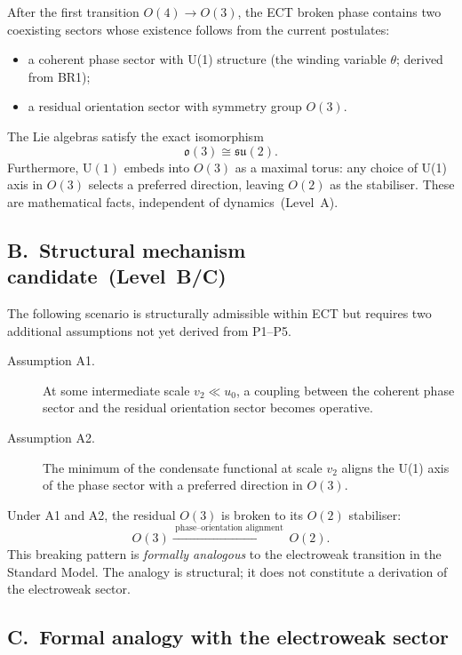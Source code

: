 \documentclass[11pt,a4paper]{article}
\numberwithin{equation}{section}
\begin{document}
After the first transition $O(4)\to O(3)$, the ECT broken phase
contains two coexisting sectors whose existence follows from the
current postulates:
\begin{itemize}
  \item a coherent phase sector with U(1) structure
    (the winding variable $\theta$; derived from BR1);
  \item a residual orientation sector with symmetry group $O(3)$.
\end{itemize}
The Lie algebras satisfy the exact isomorphism
\begin{equation}
  \mathfrak{o}(3) \cong \mathfrak{su}(2).
  \label{eq:app_o3_su2}
\end{equation}
Furthermore, $\text{U}(1)$ embeds into $O(3)$ as a maximal torus:
any choice of U(1) axis in $O(3)$ selects a preferred direction,
leaving $O(2)$ as the stabiliser.
These are mathematical facts, independent of dynamics~(Level~A).

\subsection*{B.\ Structural mechanism candidate~(Level~B/C)}

The following scenario is structurally admissible within ECT
but requires two additional assumptions not yet derived from P1--P5.

\begin{description}
  \item[Assumption A1.]
    At some intermediate scale $v_2\ll u_0$, a coupling
    between the coherent phase sector and the residual
    orientation sector becomes operative.
  \item[Assumption A2.]
    The minimum of the condensate functional at scale $v_2$
    aligns the U(1) axis of the phase sector with a preferred
    direction in $O(3)$.
\end{description}

Under A1 and A2, the residual $O(3)$ is broken to its $O(2)$
stabiliser:
\begin{equation}
  O(3) \xrightarrow{\;\text{phase--orientation alignment}\;}
  O(2).
  \label{eq:app_O3_O2}
\end{equation}
This breaking pattern is \emph{formally analogous} to the
electroweak transition in the Standard Model.
The analogy is structural; it does not constitute a derivation
of the electroweak sector.

\subsection*{C.\ Formal analogy with the electroweak sector}
\end{document}
